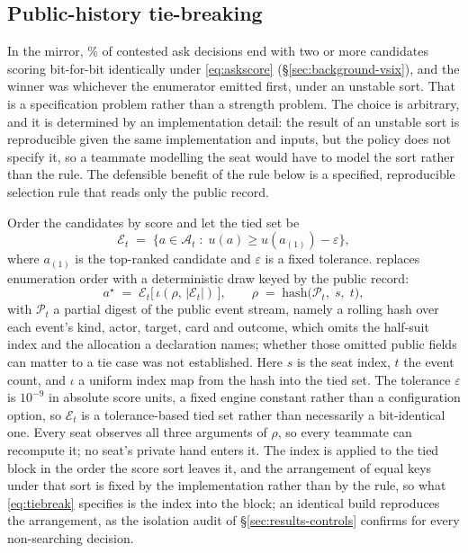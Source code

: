 \subsection{Public-history tie-breaking}
\label{sec:agent-tiebreak}

In the \vsix{} mirror, \vsevenTieContested\% of contested ask decisions end with two or more
candidates scoring bit-for-bit identically under \eqref{eq:askscore}
(\S\ref{sec:background-vsix}), and the winner was whichever the enumerator emitted first, under an
unstable sort. That is a specification problem rather than a strength problem. The choice is
arbitrary, and it is determined by an implementation detail: the result of an unstable sort is
reproducible given the same implementation and inputs, but the policy does not specify it, so a
teammate modelling the seat would have to model the sort rather than the rule. The defensible
benefit of the rule below is a specified, reproducible selection rule that reads only the public
record.

Order the candidates by score and let the tied set be
\begin{equation}
  \mathcal{E}_t \;=\; \bigl\{a \in \mathcal{A}_t \;:\; u(a) \ge u(a_{(1)}) - \varepsilon \bigr\},
  \label{eq:tieset}
\end{equation}
where $a_{(1)}$ is the top-ranked candidate and $\varepsilon$ is a fixed tolerance. \sestina{}
replaces enumeration order with a deterministic draw keyed by the public record:
\begin{equation}
  a^\star \;=\; \mathcal{E}_t\bigl[\,\iota(\rho,\,|\mathcal{E}_t|)\,\bigr],
  \qquad
  \rho \;=\; \mathrm{hash}\bigl(\mathcal{P}_t,\; s,\; t\bigr),
  \label{eq:tiebreak}
\end{equation}
with $\mathcal{P}_t$ a partial digest of the public event stream, namely a rolling hash over each
event's kind, actor, target, card and outcome, which omits the half-suit index and the allocation a
declaration names; whether those omitted public fields can matter to a tie case was not
established. Here $s$ is the seat index, $t$ the event count, and $\iota$ a uniform index map from
the hash into the tied set. The tolerance
$\varepsilon$ is $10^{-9}$ in absolute score units, a fixed engine constant rather than a
configuration option, so $\mathcal{E}_t$ is a tolerance-based tied set rather than necessarily a
bit-identical one. Every seat observes all three arguments of $\rho$, so every teammate can
recompute it; no seat's private hand enters it. The index is applied to the tied block in the order
the score sort leaves it, and the arrangement of equal keys under that sort is fixed by the
implementation rather than by the rule, so what \eqref{eq:tiebreak} specifies is the index into the
block; an identical build reproduces the arrangement, as the isolation audit of
\S\ref{sec:results-controls} confirms for every non-searching decision.

